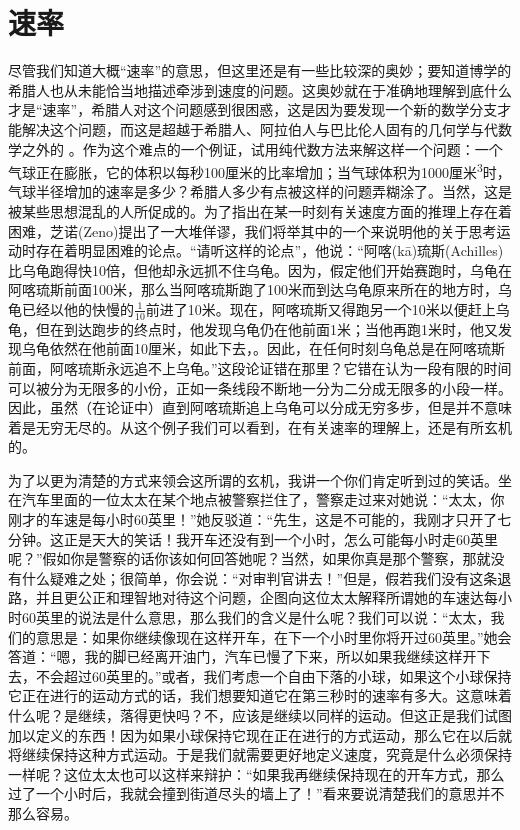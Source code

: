 \documentclass[12pt,oneside]{book}
\begin{document}
\section{速率}
尽管我们知道大概“速率”的意思，但这里还是有一些比较深的奥妙；要知道博学的希腊人也从未能恰当地描述牵涉到速度的问题。这奥妙就在于准确地理解到底什么才是“速率”，希腊人对这个问题感到很困惑，这是因为要发现一个新的数学分支才能解决这个问题，而这是超越于希腊人、阿拉伯人与巴比伦人固有的几何学与代数学之外的 。作为这个难点的一个例证，试用纯代数方法来解这样一个问题：一个气球正在膨胀，它的体积以每秒100厘米的比率增加；当气球体积为1000\unit{厘米^3}时，气球半径增加的速率是多少？希腊人多少有点被这样的问题弄糊涂了。当然，这是被某些思想混乱的人所促成的。为了指出在某一时刻有关速度方面的推理上存在着困难，芝诺(Zeno)提出了一大堆佯谬，我们将举其中的一个来说明他的关于思考运动时存在着明显困难的论点。“请听这样的论点”，他说：“阿喀(kā)琉斯(Achilles)比乌龟跑得快10倍，但他却永远抓不住乌龟。因为，假定他们开始赛跑时，乌龟在阿喀琉斯前面100米，那么当阿喀琉斯跑了100米而到达乌龟原来所在的地方时，乌龟已经以他的快慢的$\frac{1}{10}$前进了10米。现在，阿喀琉斯又得跑另一个10米以便赶上乌龟，但在到达跑步的终点时，他发现乌龟仍在他前面1米；当他再跑1米时，他又发现乌龟依然在他前面10厘米，如此下去，。因此，在任何时刻乌龟总是在阿喀琉斯前面，阿喀琉斯永远追不上乌龟。”这段论证错在那里？它错在认为一段有限的时间可以被分为无限多的小份，正如一条线段不断地一分为二分成无限多的小段一样。因此，虽然（在论证中）直到阿喀琉斯追上乌龟可以分成无穷多步，但是并不意味着是无穷无尽的。从这个例子我们可以看到，在有关速率的理解上，还是有所玄机的。

为了以更为清楚的方式来领会这所谓的玄机，我讲一个你们肯定听到过的笑话。坐在汽车里面的一位太太在某个地点被警察拦住了，警察走过来对她说：“太太，你刚才的车速是每小时60英里！”她反驳道：“先生，这是不可能的，我刚才只开了七分钟。这正是天大的笑话！我开车还没有到一个小时，怎么可能每小时走60英里呢？”假如你是警察的话你该如何回答她呢？当然，如果你真是那个警察，那就没有什么疑难之处；很简单，你会说：“对审判官讲去！”但是，假若我们没有这条退路，并且更公正和理智地对待这个问题，企图向这位太太解释所谓她的车速达每小时60英里的说法是什么意思，那么我们的含义是什么呢？我们可以说：“太太，我们的意思是：如果你继续像现在这样开车，在下一个小时里你将开过60英里。”她会答道：“嗯，我的脚已经离开油门，汽车已慢了下来，所以如果我继续这样开下去，不会超过60英里的。”或者，我们考虑一个自由下落的小球，如果这个小球保持它正在进行的运动方式的话，我们想要知道它在第三秒时的速率有多大。这意味着什么呢？是继续，落得更快吗？不，应该是继续以同样的运动。但这正是我们试图加以定义的东西！因为如果小球保持它现在正在进行的方式运动，那么它在以后就将继续保持这种方式运动。于是我们就需要更好地定义速度，究竟是什么必须保持一样呢？这位太太也可以这样来辩护：“如果我再继续保持现在的开车方式，那么过了一个小时后，我就会撞到街道尽头的墙上了！”看来要说清楚我们的意思并不那么容易。
\end{document}
